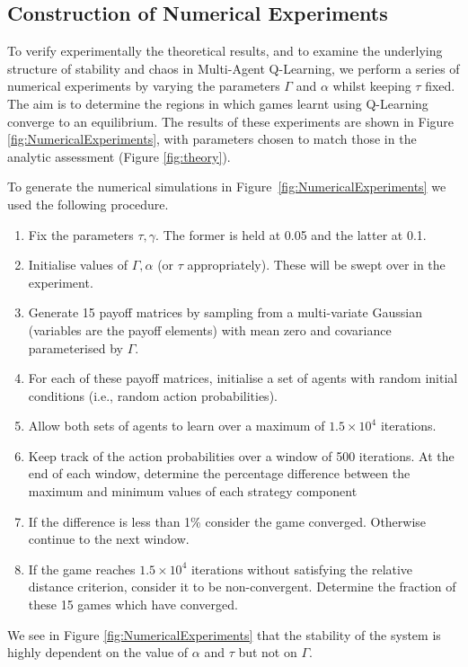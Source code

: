 \documentclass[sigconf,anonymous]{aamas}
\begin{document}
\subsection{Construction of Numerical Experiments}

To verify experimentally the theoretical results, and to examine the underlying structure of stability and chaos in
Multi-Agent Q-Learning, we perform a series of numerical experiments by varying the parameters $\Gamma$ and
$\alpha$ whilst keeping $\tau$ fixed. The aim is to determine the regions in which games learnt using Q-Learning converge to an equilibrium. The results of these experiments are shown in Figure \ref{fig:NumericalExperiments}, with parameters chosen to match those in the analytic assessment (Figure \ref{fig:theory}).

To generate the numerical simulations in Figure~\ref{fig:NumericalExperiments} we used the
following procedure.
\begin{enumerate}
   \item Fix the parameters $\tau, \gamma$. The former is held at 0.05 and the latter at 0.1.
   \item Initialise values of $\Gamma, \alpha$ (or $\tau$ appropriately). These will be swept over in the experiment.
\item Generate 15 payoff matrices by sampling from a multi-variate Gaussian 
(variables are the payoff elements) with mean zero and covariance parameterised by $\Gamma$.
\item For each of these payoff matrices, initialise a set of agents with random initial conditions (i.e., random action probabilities).
\item Allow both sets of agents to learn over a maximum of $1.5 \times 10^4$ iterations.
\item Keep track of the action probabilities over a window of 500 iterations. At the end of each window, determine the percentage difference between the maximum and minimum values of each strategy component
\item If the difference is less than 1\% consider the game converged. Otherwise continue to the next window.
\item If the game reaches $1.5 \times 10^4$ iterations without satisfying the relative distance criterion, consider it to be non-convergent. Determine the fraction of these 15 games which have converged.

\end{enumerate}
   
We see in Figure \ref{fig:NumericalExperiments} that the stability of the system is highly dependent on
the value of $\alpha$ and $\tau$ but not on $\Gamma$.
   
\end{document}
